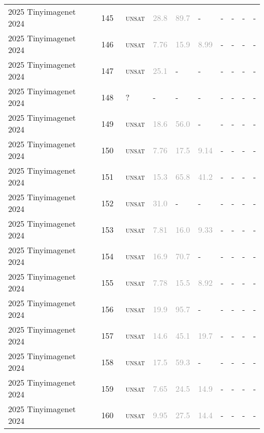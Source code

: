 \begin{center}
{\begin{longtable}{@{}llllllllll@{}}
2025 Tinyimagenet 2024 & 145 & ~\textsc{unsat} & \textcolor{darkgray}{28.8} & \textcolor{darkgray}{89.7} & - & - & - & - & - \\
2025 Tinyimagenet 2024 & 146 & ~\textsc{unsat} & \textcolor{darkgray}{7.76} & \textcolor{darkgray}{15.9} & \textcolor{darkgray}{8.99} & - & - & - & - \\
2025 Tinyimagenet 2024 & 147 & ~\textsc{unsat} & \textcolor{darkgray}{25.1} & - & - & - & - & - & - \\
2025 Tinyimagenet 2024 & 148 & ~? & - & - & - & - & - & - & - \\
2025 Tinyimagenet 2024 & 149 & ~\textsc{unsat} & \textcolor{darkgray}{18.6} & \textcolor{darkgray}{56.0} & - & - & - & - & - \\
2025 Tinyimagenet 2024 & 150 & ~\textsc{unsat} & \textcolor{darkgray}{7.76} & \textcolor{darkgray}{17.5} & \textcolor{darkgray}{9.14} & - & - & - & - \\
2025 Tinyimagenet 2024 & 151 & ~\textsc{unsat} & \textcolor{darkgray}{15.3} & \textcolor{darkgray}{65.8} & \textcolor{darkgray}{41.2} & - & - & - & - \\
2025 Tinyimagenet 2024 & 152 & ~\textsc{unsat} & \textcolor{darkgray}{31.0} & - & - & - & - & - & - \\
2025 Tinyimagenet 2024 & 153 & ~\textsc{unsat} & \textcolor{darkgray}{7.81} & \textcolor{darkgray}{16.0} & \textcolor{darkgray}{9.33} & - & - & - & - \\
2025 Tinyimagenet 2024 & 154 & ~\textsc{unsat} & \textcolor{darkgray}{16.9} & \textcolor{darkgray}{70.7} & - & - & - & - & - \\
2025 Tinyimagenet 2024 & 155 & ~\textsc{unsat} & \textcolor{darkgray}{7.78} & \textcolor{darkgray}{15.5} & \textcolor{darkgray}{8.92} & - & - & - & - \\
2025 Tinyimagenet 2024 & 156 & ~\textsc{unsat} & \textcolor{darkgray}{19.9} & \textcolor{darkgray}{95.7} & - & - & - & - & - \\
2025 Tinyimagenet 2024 & 157 & ~\textsc{unsat} & \textcolor{darkgray}{14.6} & \textcolor{darkgray}{45.1} & \textcolor{darkgray}{19.7} & - & - & - & - \\
2025 Tinyimagenet 2024 & 158 & ~\textsc{unsat} & \textcolor{darkgray}{17.5} & \textcolor{darkgray}{59.3} & - & - & - & - & - \\
2025 Tinyimagenet 2024 & 159 & ~\textsc{unsat} & \textcolor{darkgray}{7.65} & \textcolor{darkgray}{24.5} & \textcolor{darkgray}{14.9} & - & - & - & - \\
2025 Tinyimagenet 2024 & 160 & ~\textsc{unsat} & \textcolor{darkgray}{9.95} & \textcolor{darkgray}{27.5} & \textcolor{darkgray}{14.4} & - & - & - & - \\

\end{longtable}}
\end{center}

